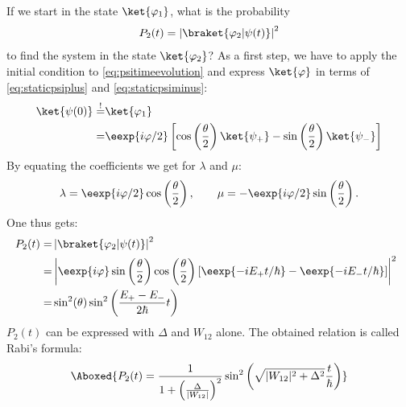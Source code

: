 				If we start in the state $\ket{\varphi_1}$, what is the probability
				\begin{align}
					P_2(t)=\left|\braket{\varphi_2|\psi(t)}\right|^2
				\end{align}
				to find the system in the state $\ket{\varphi_2}$? As a first step, we have to apply the initial condition to \eqref{eq:psitimeevolution} and express $\ket{\varphi}$ in terms of \eqref{eq:staticpsiplus} and \eqref{eq:staticpsiminus}:
				\begin{align}
					\ket{\psi(0)} \overset{!}{=}& \ket{\varphi_1}\\
											  = & \eexp{i{\varphi}/{2}} \left[ \cos\left( \frac{\theta}{2}\right) \ket{\psi_+}-\sin\left(\frac{\theta}{2}\right)\ket{\psi_-}\right]
				\end{align}
				By equating the coefficients we get for $\lambda$ and $\mu$:
				\begin{align}
					\lambda = \eexp{i{\varphi}/{2}}\cos\left(\frac{\theta}{2}\right), \qquad  \mu = -\eexp{i{\varphi}/{2}}\sin\left(\frac{\theta}{2}\right).
				\end{align}
				One thus gets:
				\begin{align}
					\hspace{-2mm} P_2(t)	=&\left|\braket{\varphi_2|\psi(t)}\right|^2 \\
											=& \left|\eexp{i\varphi} \sin\left(\frac{\theta}{2}\right)\cos\left(\frac{\theta}{2}\right)\left[\eexp{-i{E_+}t/{\hbar}} - \eexp{-i{E_-}t/{\hbar}}\right]\right|^2\\
											=& \sin^2(\theta)\sin^2\left(\frac{E_+-E_-}{2\hbar}t\right)
				\end{align}
				$P_2(t)$ can be expressed with $\Delta$ and $W_{12}$ alone. The obtained relation is called Rabi's formula:
				\begin{align}
					\Aboxed{P_2(t)=\frac{1}{1+\left(\frac{\Delta}{|W_{12}|}\right)^2}\sin^2\left(\sqrt{|W_{12}|^2+\Delta^2}\frac{t}{\hbar}\right)}
				\end{align}

